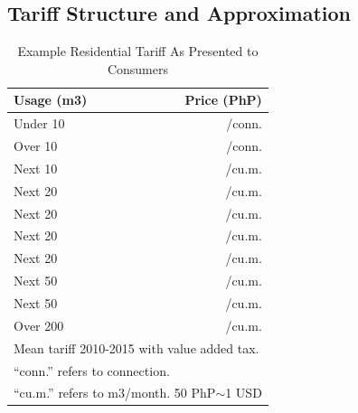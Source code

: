 \documentclass[12pt]{article}
\begin{document}
\subsection{Tariff Structure and Approximation}\label{appendix:tariff}



\begin{table}[H]
\centering
\caption{Example Residential Tariff As Presented to Consumers}\label{table:tarifftrue}
\vspace{-2mm}
\begin{tabular}{l*{1}{r}}
\toprule
Usage (m3) & Price (PhP) \\
\midrule
Under  10    &   /conn. \\
Over  10     &   /conn. \\
Next   10    &   /cu.m. \\
Next    20   &   /cu.m. \\
Next   20    &   /cu.m. \\
Next    20   &   /cu.m. \\
Next    20   &   /cu.m. \\
Next    50   &   /cu.m. \\
Next   50    &   /cu.m. \\
Over  200    &   /cu.m. \\
\bottomrule
\multicolumn{2}{l}{\scriptsize Mean tariff 2010-2015 with value added tax. }\\[-.5em]
\multicolumn{2}{l}{\scriptsize ``conn.'' refers to connection. }\\[-.5em]
\multicolumn{2}{l}{\scriptsize ``cu.m.'' refers to m3/month.  50 PhP$\sim$1 USD }
\end{tabular}
\end{table}
\end{document}
